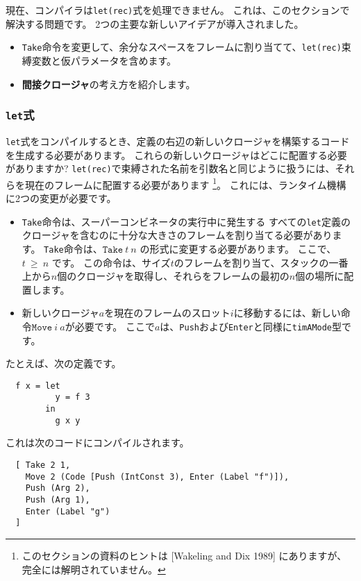 \documentclass{jarticle}
\begin{document}
現在、コンパイラは\texttt{let(rec)}式を処理できません。
これは、このセクションで解決する問題です。
2つの主要な新しいアイデアが導入されました。

\begin{itemize}
	\item \texttt{Take}命令を変更して、余分なスペースをフレームに割り当てて、\texttt{let(rec)}束縛変数と仮パラメータを含めます。
	\item \textbf{間接クロージャ}の考え方を紹介します。
\end{itemize}

\subsubsection{\texttt{let}式}

\texttt{let}式をコンパイルするとき、定義の右辺の新しいクロージャを構築するコードを生成する必要があります。
これらの新しいクロージャはどこに配置する必要がありますか?
\texttt{let(rec)}で束縛された名前を引数名と同じように扱うには、それらを現在のフレームに配置する必要があります
\footnote{このセクションの資料のヒントは [Wakeling and Dix 1989] にありますが、完全には解明されていません。}。
これには、ランタイム機構に2つの変更が必要です。

\begin{itemize}
	\item \texttt{Take}命令は、スーパーコンビネータの実行中に発生する
	      すべての\texttt{let}定義のクロージャを含むのに十分な大きさのフレームを割り当てる必要があります。
	      \texttt{Take}命令は、$\texttt{Take} ~ t ~ n$ の形式に変更する必要があります。
	      ここで、$t ~ \ge ~ n$ です。
	      この命令は、サイズ$t$のフレームを割り当て、スタックの一番上から$n$個のクロージャを取得し、それらをフレームの最初の$n$個の場所に配置します。
	\item 新しいクロージャ$a$を現在のフレームのスロット$i$に移動するには、新しい命令$\texttt{Move} ~ i ~ a$が必要です。
	      ここで$a$は、\texttt{Push}および\texttt{Enter}と同様に\texttt{timAMode}型です。
\end{itemize}

たとえば、次の定義です。

\begin{verbatim}
  f x = let
          y = f 3
        in
          g x y
\end{verbatim}

これは次のコードにコンパイルされます。

\begin{verbatim}
  [ Take 2 1,
    Move 2 (Code [Push (IntConst 3), Enter (Label "f")]),
    Push (Arg 2),
    Push (Arg 1),
    Enter (Label "g")
  ]
\end{verbatim}
\end{document}
